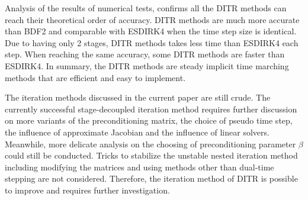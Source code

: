 Analysis of the results of numerical tests, confirms
all the DITR methods can reach their theoretical order of accuracy.
DITR methods are much more accurate than
BDF2 and comparable with ESDIRK4 when the time step size is 
identical.
Due to having only 2 stages, DITR methods takes less time than ESDIRK4
each step.
When reaching the same accuracy, some DITR methods are faster than ESDIRK4.
In summary, the DITR methods are steady implicit time marching methods
that are efficient and easy to implement.

The iteration methods discussed in the current paper are still crude.
The currently successful stage-decoupled iteration method 
requires further discussion on 
more variants of the preconditioning matrix, 
the choice of pseudo time step, the influence of approximate
Jacobian and the influence of linear solvers.
Meanwhile, more delicate analysis on the choosing of preconditioning parameter
$\beta$ could still be conducted.
Tricks to stabilize the unstable nested iteration method 
including modifying the matrices and
using methods other than dual-time stepping are not considered.
Therefore, the iteration method of DITR is possible to improve and 
requires further investigation.